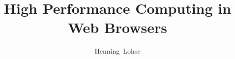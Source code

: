 \title{High Performance Computing in Web Browsers}
\author{Henning~Lohse}

%
{}

\maketitle


\begin{abstract}

\end{abstract}

\begin{IEEEkeywords}

\end{IEEEkeywords}